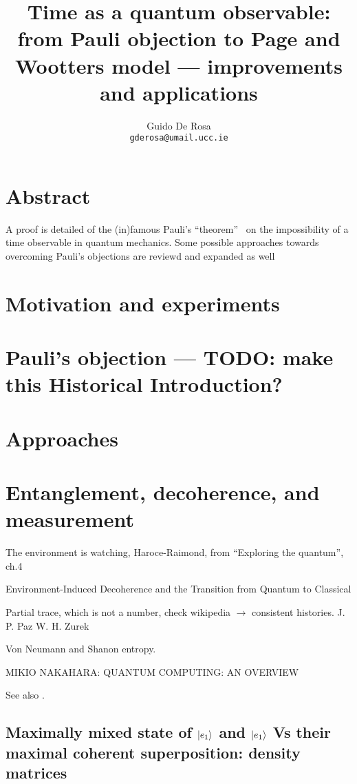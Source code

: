 \documentclass{book}
\author{Guido De Rosa \\ \small\tt{gderosa@umail.ucc.ie}}
\title{Time as a quantum observable: from Pauli objection to Page and Wootters model --- improvements and applications}
\begin{document}
\maketitle

\tableofcontents

\chapter*{Abstract}
A proof is detailed of the (in)famous Pauli's ``theorem''~\cite{PauliFootnote}
on the impossibility of a time observable in quantum mechanics. Some possible
approaches towards overcoming Pauli's objections are reviewd and expanded as well

\chapter{Motivation and experiments}


\chapter{Pauli's objection --- TODO: make this Historical Introduction?}



\chapter{Approaches}


\chapter{Entanglement, decoherence, and measurement}
The environment is watching, Haroce-Raimond, from ``Exploring the quantum'', ch.4

Environment-Induced Decoherence and the Transition from Quantum to Classical

Partial trace, which is not a number, check wikipedia $\rightarrow$ consistent histories.
J. P. Paz W. H. Zurek

Von Neumann and Shanon entropy.

MIKIO NAKAHARA: QUANTUM COMPUTING: AN OVERVIEW

See also \cite{Schlosshauer_Decoherence}.

\section{Maximally mixed state of $\ket{e_1}$ and $\ket{e_1}$
Vs their maximal coherent superposition: density matrices}
\end{document}
